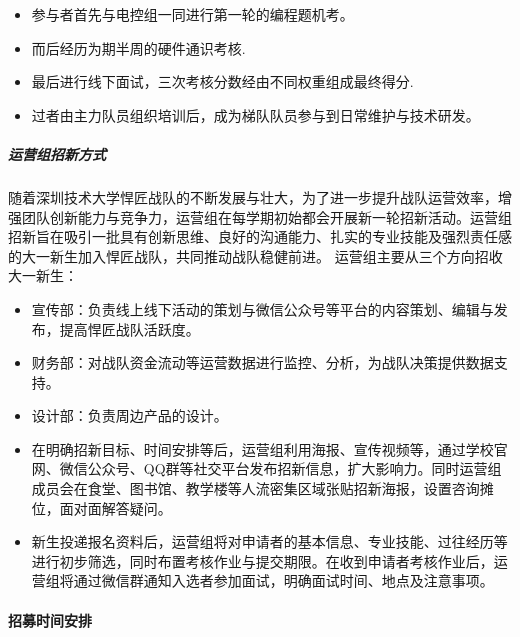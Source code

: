 
                \begin{itemize}
                    \item 参与者首先与电控组一同进行第一轮的编程题机考。
                    \item 而后经历为期半周的硬件通识考核.
                    \item 最后进行线下面试，三次考核分数经由不同权重组成最终得分.
                    \item 过者由主力队员组织培训后，成为梯队队员参与到日常维护与技术研发。
                \end{itemize}

            \subparagraph{运营组招新方式}

                随着深圳技术大学悍匠战队的不断发展与壮大，为了进一步提升战队运营效率，增强团队创新能力与竞争力，运营组在每学期初始都会开展新一轮招新活动。运营组招新旨在吸引一批具有创新思维、良好的沟通能力、扎实的专业技能及强烈责任感的大一新生加入悍匠战队，共同推动战队稳健前进。
                运营组主要从三个方向招收大一新生：


                \begin{itemize}
                    \item 宣传部：负责线上线下活动的策划与微信公众号等平台的内容策划、编辑与发布，提高悍匠战队活跃度。
                    \item 财务部：对战队资金流动等运营数据进行监控、分析，为战队决策提供数据支持。
                    \item 设计部：负责周边产品的设计。
                    \item 在明确招新目标、时间安排等后，运营组利用海报、宣传视频等，通过学校官网、微信公众号、QQ群等社交平台发布招新信息，扩大影响力。同时运营组成员会在食堂、图书馆、教学楼等人流密集区域张贴招新海报，设置咨询摊位，面对面解答疑问。
                    \item 新生投递报名资料后，运营组将对申请者的基本信息、专业技能、过往经历等进行初步筛选，同时布置考核作业与提交期限。在收到申请者考核作业后，运营组将通过微信群通知入选者参加面试，明确面试时间、地点及注意事项。
                \end{itemize}

        \paragraph{招募时间安排}

